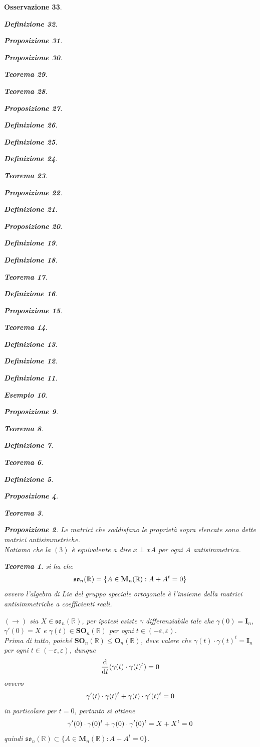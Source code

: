 \documentclass[oneside, 11pt]{amsbook}
\makeatletter
\newcommand{\0}{{(0)}}
\newcommand{\3}{{(3)}}
\theoremstyle{colonplain}
\newtheorem{thm}{Teorema}[chapter]
\newtheorem{prop}[thm]{Proposizione}
\theoremstyle{colondefinition}
\newtheorem{defn}[thm]{Definizione}
\newtheorem{ex}[thm]{Esempio}
\theoremstyle{colonremark}
\newtheorem{rmk}[thm]{Osservazione}
\numberwithin{equation}{chapter}
\renewcommand{\proofname}{Dimostrazione}
\renewenvironment{proof}[1][\proofname]{\par
  \pushQED{\end{proof}}%
  \normalfont \topsep6\p@\@plus6\p@\relax
  \trivlist
  \item[\hskip\labelsep\bfseries #1:]\ignorespaces
}{%
  \popQED\endtrivlist\@endpefalse
}
\makeatother
\begin{document}
\begin{rmk}
\begin{defn}
\begin{prop}
\begin{prop}
\begin{thm}
\begin{thm}
\begin{prop}
\begin{defn}
\begin{defn}
\begin{defn}
\begin{thm}
\begin{prop}
\begin{defn}
\begin{prop}
\begin{defn}
\begin{defn}
\begin{thm}
\begin{defn}
\begin{prop}
\begin{thm}
\begin{defn}
\begin{defn}
\begin{defn}
\begin{ex}
\begin{prop}
\begin{thm}
\begin{defn}
\begin{thm}
\begin{defn}
\begin{prop}
\begin{proof}
\begin{proof}
\begin{proof}
\begin{proof}
\begin{proof}[Soluzione]
\begin{proof}
\begin{proof}
\begin{thm}
\begin{prop}
\begin{proof}
Le matrici che soddisfano le proprietà sopra elencate sono dette \textit{matrici antisimmetriche}. \\
Notiamo che la $(3)$ è equivalente a dire $x \perp xA$ per ogni $A$ antisimmetrica. \end{proof}
\begin{thm} si ha che
\begin{align}
    \mathfrak{so}_n(\mathbb{R}) = \{ A \in \mathbf{M}_n(\mathbb{R}) : A + A^t = 0 \} \notag
\end{align}
ovvero l'algebra di Lie del gruppo speciale ortogonale è l'insieme della matrici antisimmetriche a coefficienti reali. \\

\begin{proof} $(\rightarrow)$ sia $X \in \mathfrak{so}_n(\mathbb{R})$, per ipotesi esiste $\gamma$ differenziabile tale che $\gamma(0) = \mathbf{I}_n$, $\gamma'(0) = X$ e $\gamma(t) \in \mathbf{SO}_n(\mathbb{R})$ per ogni $t \in (-\varepsilon, \varepsilon)$. \\
Prima di tutto, poiché $\mathbf{SO}_n(\mathbb{R}) \leq \mathbf{O}_n(\mathbb{R})$, deve valere che $\gamma(t) \cdot \gamma(t)^t = \mathbf{I}_n$ per ogni $t \in (-\varepsilon, \varepsilon)$, dunque
\begin{align}
    \frac{\mathrm{d}}{\mathrm{d}t} (\gamma(t) \cdot \gamma(t)^t) = 0 \notag
\end{align}
ovvero
\begin{align}
    \gamma'(t) \cdot \gamma(t)^t + \gamma(t) \cdot \gamma'(t)^t = 0 \notag
\end{align}
in particolare per $t = 0$, pertanto si ottiene
\begin{align}
    \gamma'(0) \cdot \gamma (0)^t + \gamma(0) \cdot \gamma'(0)^t = X + X^t = 0 \notag
\end{align}
quindi $\mathfrak{so}_n(\mathbb{R}) \subset \{ A \in \mathbf{M}_n(\mathbb{R}) : A + A^t = 0 \}$. \\ \\

\end{proof}
\end{thm}
\end{prop}
\end{thm}
\end{proof}
\end{proof}
\end{proof}
\end{proof}
\end{proof}
\end{proof}
\end{proof}
\end{prop}
\end{defn}
\end{thm}
\end{defn}
\end{thm}
\end{prop}
\end{ex}
\end{defn}
\end{defn}
\end{defn}
\end{thm}
\end{prop}
\end{defn}
\end{thm}
\end{defn}
\end{defn}
\end{prop}
\end{defn}
\end{prop}
\end{thm}
\end{defn}
\end{defn}
\end{defn}
\end{prop}
\end{thm}
\end{thm}
\end{prop}
\end{prop}
\end{defn}
\end{rmk}
\end{document}
